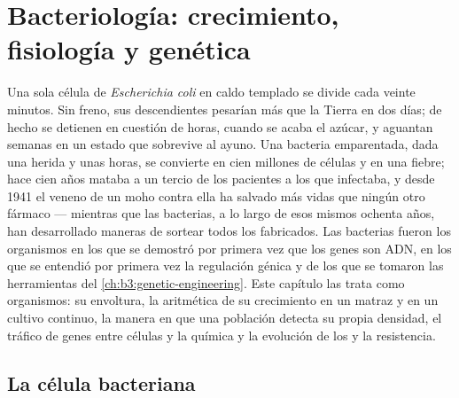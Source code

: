 \chapter{Bacteriología: crecimiento, fisiología y genética}\label{ch:b3:bacteriology}

Una sola célula de \emph{Escherichia coli} en caldo templado se divide
cada veinte minutos. Sin freno, sus descendientes pesarían más que la
Tierra en dos días; de hecho se detienen en cuestión de horas, cuando se
acaba el azúcar, y aguantan semanas en un estado que sobrevive al ayuno.
Una bacteria emparentada, dada una herida y unas horas, se convierte en
cien millones de células y en una fiebre; hace cien años mataba a un
tercio de los pacientes a los que infectaba, y desde 1941 el veneno de un
moho contra ella ha salvado más vidas que ningún otro fármaco --- mientras
que las bacterias, a lo largo de esos mismos ochenta años, han
desarrollado maneras de sortear todos los  fabricados. Las
bacterias fueron los organismos en los que se demostró por primera vez
que los genes son ADN, en los que se entendió por primera vez la
regulación génica y de los que se tomaron las herramientas del
\cref{ch:b3:genetic-engineering}. Este capítulo las trata como
organismos: su envoltura, la aritmética de su crecimiento en un matraz y
en un cultivo continuo, la manera en que una población detecta su propia
densidad, el tráfico de genes entre células y la química y la evolución de
los  y la resistencia.

\section{La célula bacteriana}

